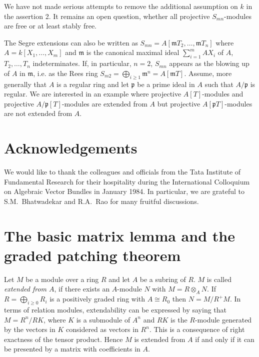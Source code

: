 We have not made serious attempts to remove the additional assumption
on $k$ in the assertion 2. It remains an open question, whether all
projective $S_{mn}$-modules are free or at least stably free.

The Segre extensions can also be written as
$S_{mn}=A[\mathfrak{m}T_{2},\ldots,\mathfrak{m}T_{n}]$ where
$A=k[X_{1},\ldots,X_{m}]$ and $\mathfrak{m}$ is the canonical maximal
ideal $\sum\limits^{m}_{i=1}AX_{i}$ of $A$, $T_{2},\ldots,T_{n}$
indeterminates. If, in particular, $n=2$, $S_{mn}$ appears as the
blowing up of $A$ in $\mathfrak{m}$, i.e. as the Rees ring
$S_{m2}=\bigoplus\limits_{i\geq
1}\mathfrak{m}^{n}=A[\mathfrak{m}T]$. Assume, more generally that $A$
is a regular ring and let $\mathfrak{p}$ be a prime ideal in $A$ such
that $A/\mathfrak{p}$ is regular. We are interested in an example
where projective $A[T]$-modules and projective
$A/\mathfrak{p}[T]$-modules are extended from $A$ but projective
$A[\mathfrak{p}T]$-modules are not extended from $A$.

\section*{Acknowledgements}

We would like to thank the colleagues and officials from the Tata
Institute of Fundamental Research for their hospitality during the
International Colloquium on Algebraic Vector Bundles in January
1984. In particular, we are grateful to S.M.~Bhatwadekar\pageoriginale
and R.A.~Rao for many fruitful discussions.

\section{The basic matrix lemma and the graded patching
theorem}\label{chap10-sec1} 

Let $M$ be a module over a ring $R$ and let $A$ be a subring of
$R$. $M$ is called {\em extended from $A$}, if there exists an
$A$-module $N$ with $M=R\otimes_{A}N$. If $R=\bigoplus\limits_{i\geq
0}R_{i}$ is a positively graded ring with $A\cong R_{0}$ then
$N=M/R^{+}M$. In terms of relation modules, extendability can be
expressed by saying that $M=R^{n}/RK$, where $K$ is a submodule of
$A^{n}$ and $RK$ is the $R$-module generated by the vectors in $K$
considered as vectors in $R^{n}$. This is a consequence of right
exactness of the tensor product. Hence $M$ is extended from $A$ if and
only if it can be presented by a matrix with coefficients in $A$.

